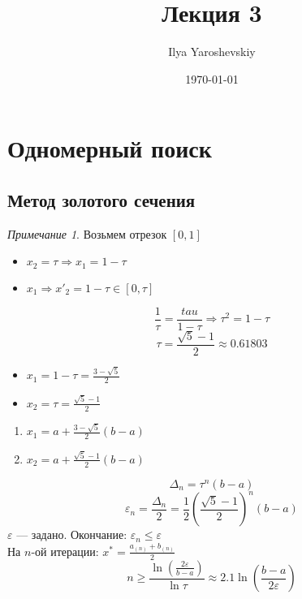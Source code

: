 \documentclass[english]{article}
\author{Ilya Yaroshevskiy}
\date{\today}
\title{Лекция 3}
\theoremstyle{plain}
\theoremstyle{remark}
\newtheorem*{remark}{Примечание}
\theoremstyle{definition}
\begin{document}
\maketitle
\tableofcontents


\section{Одномерный поиск}
\label{sec:orgc46882b}
\subsection{Метод золотого сечения}
\label{sec:org9527fe9}
\begin{remark}
Возьмем отрезок \([0, 1]\)
\begin{itemize}
\item \(x_2 = \tau \Rightarrow x_1 = 1 - \tau\)
\item \(x_1 \Rightarrow x'_2 = 1 - \tau \in [0, \tau]\)
\end{itemize}
\[ \frac{1}{\tau} = \frac{tau}{1 - \tau} \Rightarrow \tau^2 = 1 - \tau\]
\[ \tau = \frac{\sqrt{5} - 1}{2} \approx 0.61803 \]
\begin{itemize}
\item \(x_1 = 1 - \tau = \frac{3 - \sqrt{5}}{2}\)
\item \(x_2 = \tau = \frac{\sqrt{5} - 1}{2}\)
\end{itemize}
\end{remark}
\begin{enumerate}
\item \label{x_1_3} \(x_1 = a + \frac{3 - \sqrt{5}}{2}(b - a)\)
\item \label{x_2_3} \(x_2 = a + \frac{\sqrt{5} - 1}{2}(b - a)\)
\end{enumerate}
\[ \Delta_n = \tau^n(b - a) \]
\[ \varepsilon_n = \frac{\Delta_n}{2} = \frac{1}{2}\left(\frac{\sqrt{5} - 1}{2}\right)^n(b - a) \]
\(\varepsilon\) --- задано. Окончание: \(\varepsilon_n \le \varepsilon\) \\
На \(n\text{-ой}\) итерации: \(x^* = \frac{a_{(n)} + b_{(n)}}{2}\) \\
\[ n \ge \frac{\ln\left(\frac{2\varepsilon}{b - a}\right)}{\ln \tau} \approx 2.1 \ln\left(\frac{b - a}{2\varepsilon}\right) \]
\end{document}
